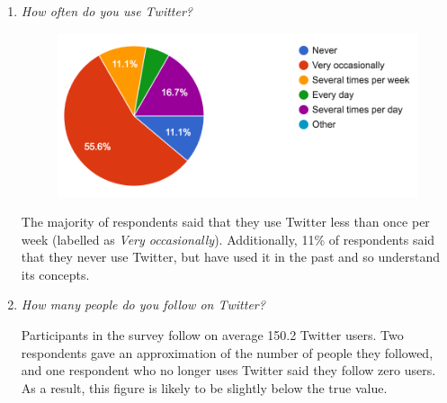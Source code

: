 \documentclass{l4proj}
\begin{document}
\begin{enumerate}

\item \textit{How often do you use Twitter?}
\par
\begin{figure}[H]
\centering
\includegraphics[scale=0.7]{howoftentwitter.png}
\label{howoftentwitter}
\end{figure}
The majority of respondents said that they use Twitter less than once per week (labelled as \textit{Very occasionally}). Additionally, 11\% of respondents said that they never use Twitter, but have used it in the past and so understand its concepts.


\item \textit{How many people do you follow on Twitter?}
\par
Participants in the survey follow on average 150.2 Twitter users. Two respondents gave an approximation of the number of people they followed, and one respondent who no longer uses Twitter said they follow zero users. As a result, this figure is likely to be slightly below the true value.


\end{enumerate}
\end{document}
